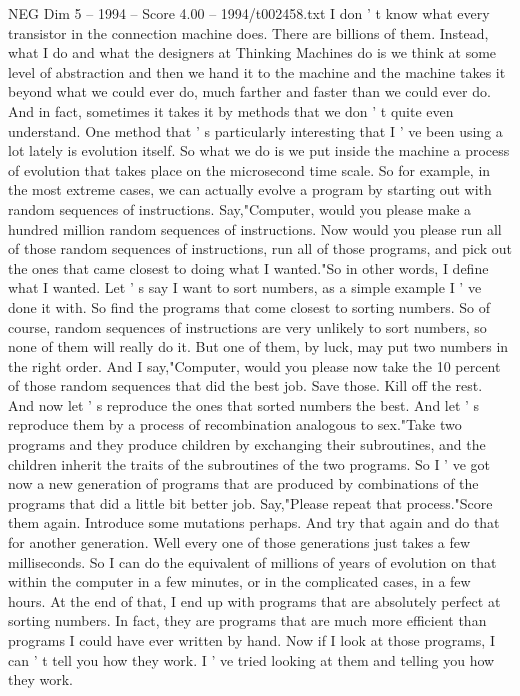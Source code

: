 \begin{textsample}{NEG Dim 5 – 1994 – Score 4.00 – 1994/t002458.txt}
I don ' t know what every transistor in the connection machine does.
There are billions of them.
Instead, what I do and what the designers at Thinking Machines do is we think at some level of abstraction and then we hand it to the machine and the machine takes it beyond what we could ever do, much farther and faster than we could ever do.
And in fact, sometimes it takes it by methods that we don ' t quite even understand.
One method that ' s particularly interesting that I ' ve been using a lot lately is evolution itself.
So what we do is we put inside the machine a process of evolution that takes place on the microsecond time scale.
So for example, in the most extreme cases, we can actually evolve a program by starting out with random sequences of instructions.
Say,"Computer, would you please make a hundred million random sequences of instructions.
Now would you please run all of those random sequences of instructions, run all of those programs, and pick out the ones that came closest to doing what I wanted."So in other words, I define what I wanted.
Let ' s say I want to sort numbers, as a simple example I ' ve done it with.
So find the programs that come closest to sorting numbers.
So of course, random sequences of instructions are very unlikely to sort numbers, so none of them will really do it.
But one of them, by luck, may put two numbers in the right order.
And I say,"Computer, would you please now take the 10 percent of those random sequences that did the best job.
Save those.
Kill off the rest.
And now let ' s reproduce the ones that sorted numbers the best.
And let ' s reproduce them by a process of recombination analogous to sex."Take two programs and they produce children by exchanging their subroutines, and the children inherit the traits of the subroutines of the two programs.
So I ' ve got now a new generation of programs that are produced by combinations of the programs that did a little bit better job.
Say,"Please repeat that process."Score them again.
Introduce some mutations perhaps.
And try that again and do that for another generation.
Well every one of those generations just takes a few milliseconds.
So I can do the equivalent of millions of years of evolution on that within the computer in a few minutes, or in the complicated cases, in a few hours.
At the end of that, I end up with programs that are absolutely perfect at sorting numbers.
In fact, they are programs that are much more efficient than programs I could have ever written by hand.
Now if I look at those programs, I can ' t tell you how they work.
I ' ve tried looking at them and telling you how they work.

\end{textsample}
